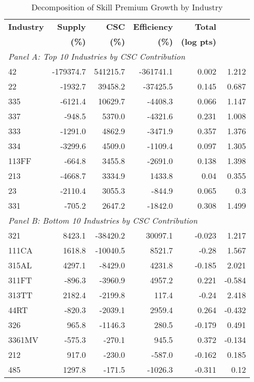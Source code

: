 \begin{table}[htbp]
\centering
\caption{Decomposition of Skill Premium Growth by Industry}
\label{tab:decomposition_by_industry}
\begin{tabular}{lrrrrr}
\hline\hline
\textbf{Industry} & \textbf{Supply} & \textbf{CSC} & \textbf{Efficiency} & \textbf{Total} & \boldmath{$\sigma - \rho$} \\
 & \textbf{(\%)} & \textbf{(\%)} & \textbf{(\%)} & \textbf{(log pts)} &  \\ \hline
\multicolumn{6}{l}{\textit{Panel A: Top 10 Industries by CSC Contribution}} \\ \hline
42 & -179374.7 & 541215.7 & -361741.1 & 0.002 & 1.212 \\
22 & -1932.7 & 39458.2 & -37425.5 & 0.145 & 0.687 \\
335 & -6121.4 & 10629.7 & -4408.3 & 0.066 & 1.147 \\
337 & -948.5 & 5370.0 & -4321.6 & 0.231 & 1.008 \\
333 & -1291.0 & 4862.9 & -3471.9 & 0.357 & 1.376 \\
334 & -3299.6 & 4509.0 & -1109.4 & 0.097 & 1.305 \\
113FF & -664.8 & 3455.8 & -2691.0 & 0.138 & 1.398 \\
213 & -4668.7 & 3334.9 & 1433.8 & 0.04 & 0.355 \\
23 & -2110.4 & 3055.3 & -844.9 & 0.065 & 0.3 \\
331 & -705.2 & 2647.2 & -1842.0 & 0.308 & 1.499 \\
\hline
\multicolumn{6}{l}{\textit{Panel B: Bottom 10 Industries by CSC Contribution}} \\ \hline
321 & 8423.1 & -38420.2 & 30097.1 & -0.023 & 1.217 \\
111CA & 1618.8 & -10040.5 & 8521.7 & -0.28 & 1.567 \\
315AL & 4297.1 & -8429.0 & 4231.8 & -0.185 & 2.021 \\
311FT & -896.3 & -3960.9 & 4957.2 & 0.221 & -0.584 \\
313TT & 2182.4 & -2199.8 & 117.4 & -0.24 & 2.418 \\
44RT & -820.3 & -2039.1 & 2959.4 & 0.264 & -0.432 \\
326 & 965.8 & -1146.3 & 280.5 & -0.179 & 0.491 \\
3361MV & -575.3 & -270.1 & 945.5 & 0.372 & -0.134 \\
212 & 917.0 & -230.0 & -587.0 & -0.162 & 0.185 \\
485 & 1297.8 & -171.5 & -1026.3 & -0.311 & 0.12 \\

\end{tabular}
\end{table}
